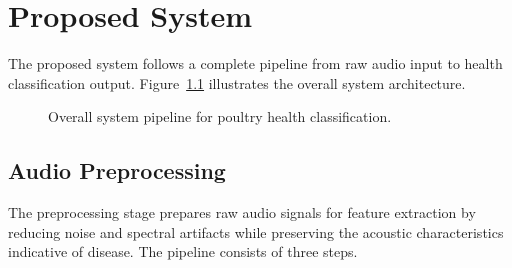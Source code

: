\documentclass[12pt,a4paper]{report}
\begin{document}
\chapter{Proposed System}
\label{ch:proposed_system}

The proposed system follows a complete pipeline from raw audio input to health classification output. Figure~\ref{fig:system_pipeline} illustrates the overall system architecture.

\begin{figure}[H]
    \centering
    \caption{Overall system pipeline for poultry health classification.}
    \label{fig:system_pipeline}
\end{figure}

\section{Audio Preprocessing}
\label{sec:preprocessing}

The preprocessing stage prepares raw audio signals for feature extraction by reducing noise and spectral artifacts while preserving the acoustic characteristics indicative of disease. The pipeline consists of three steps.
\end{document}
